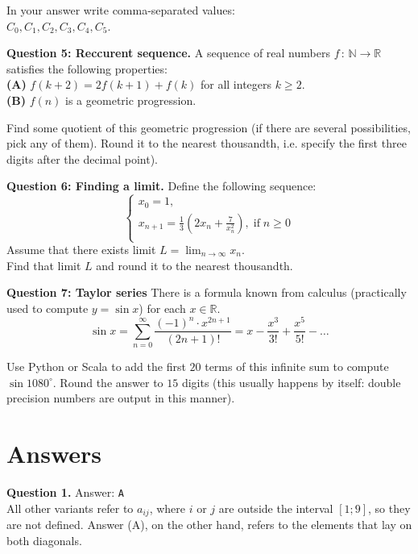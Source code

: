 \documentclass[jou]{apa6}
\begin{document}
In your answer write comma-separated values:\\
$C_0,C_1,C_2,C_3,C_4,C_5$.



\vspace{6pt}
{\bf Question 5: Reccurent sequence.} A sequence of real numbers 
$f\,:\,\mathbb{N} \rightarrow \mathbb{R}$ satisfies 
the following properties:\\
{\bf (A)} $f(k+2) = 2f(k+1) + f(k)$ for all integers $k \geq 2$.\\
{\bf (B)} $f(n)$ is a geometric progression.

Find some quotient of this geometric progression (if there are several possibilities, pick any of them). 
Round it to the nearest thousandth, i.e. specify the first three digits after the decimal point). 


\vspace{6pt}
{\bf Question 6: Finding a limit.} Define the following sequence: 
$$\left\{ \begin{array}{l} 
x_0 = 1,\\
x_{n+1} = \frac{1}{3} \left( 2x_n + \frac{7}{x_n^2}\right),\;\text{if}\;n\geq 0\\
\end{array} \right.$$
Assume that there exists limit $L = \lim_{n \rightarrow \infty} x_n$.\\
Find that limit $L$ and round it to 
the nearest thousandth. 



\vspace{6pt}
{\bf Question 7: Taylor series} There is a formula known from calculus (practically 
used to compute $y = \sin x$) for each $x \in \mathbb{R}$. 
$$\sin x = \sum\limits_{n=0}^{\infty} \frac{(-1)^n \cdot x^{2n+1}}{(2n+1)!} = x - \frac{x^3}{3!}
+ \frac{x^5}{5!} - \ldots$$

Use Python or Scala to add the first $20$ terms of this infinite sum
to compute $\sin 1080^{\circ}$. Round the answer
to $15$ digits (this usually happens by itself: double precision numbers are output in this manner).


\newpage

\section{Answers}


\vspace{6pt}
{\bf Question 1.} Answer: {\tt A}\\
All other variants refer to $a_{ij}$, where $i$ or $j$ are outside the interval $[1;9]$, 
so they are not defined. Answer (A), on the other hand, refers to the elements that
lay on both diagonals.
\end{document}

